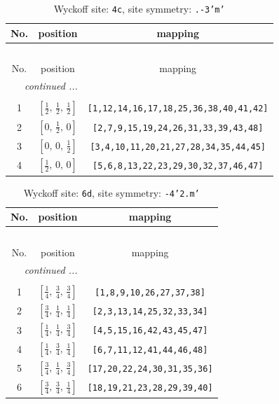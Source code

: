 \documentclass[fleqn,8pt]{jsarticle}
\begin{document}
\renewcommand{\arraystretch}{1.2}
\begin{longtable}{ccc}
\caption{Wyckoff site: {\tt 4c}, site symmetry: {\tt .-3'm'}}
 \\
 \hline \hline
No. & position & mapping \\ \hline \endfirsthead

\multicolumn{2}{l}{\tablename\ \thetable{}} \\
 \hline \hline
No. & position & mapping \\ \hline \endhead

 \hline \hline
\multicolumn{2}{r}{\footnotesize\it continued ...} \\ \endfoot

 \hline \hline
\multicolumn{2}{r}{} \\ \endlastfoot

1 & $\left[ \frac{1}{2},\, \frac{1}{2},\, \frac{1}{2} \right]$ & {\tt [1,12,14,16,17,18,25,36,38,40,41,42]} \\ \hline
2 & $\left[ 0,\, \frac{1}{2},\, 0 \right]$ & {\tt [2,7,9,15,19,24,26,31,33,39,43,48]} \\ \hline
3 & $\left[ 0,\, 0,\, \frac{1}{2} \right]$ & {\tt [3,4,10,11,20,21,27,28,34,35,44,45]} \\ \hline
4 & $\left[ \frac{1}{2},\, 0,\, 0 \right]$ & {\tt [5,6,8,13,22,23,29,30,32,37,46,47]} \\
\end{longtable}
\renewcommand{\arraystretch}{1.2}
\begin{longtable}{ccc}
\caption{Wyckoff site: {\tt 6d}, site symmetry: {\tt -4'2.m'}}
 \\
 \hline \hline
No. & position & mapping \\ \hline \endfirsthead

\multicolumn{2}{l}{\tablename\ \thetable{}} \\
 \hline \hline
No. & position & mapping \\ \hline \endhead

 \hline \hline
\multicolumn{2}{r}{\footnotesize\it continued ...} \\ \endfoot

 \hline \hline
\multicolumn{2}{r}{} \\ \endlastfoot

1 & $\left[ \frac{1}{4},\, \frac{3}{4},\, \frac{3}{4} \right]$ & {\tt [1,8,9,10,26,27,37,38]} \\ \hline
2 & $\left[ \frac{3}{4},\, \frac{1}{4},\, \frac{1}{4} \right]$ & {\tt [2,3,13,14,25,32,33,34]} \\ \hline
3 & $\left[ \frac{1}{4},\, \frac{1}{4},\, \frac{3}{4} \right]$ & {\tt [4,5,15,16,42,43,45,47]} \\ \hline
4 & $\left[ \frac{1}{4},\, \frac{3}{4},\, \frac{1}{4} \right]$ & {\tt [6,7,11,12,41,44,46,48]} \\ \hline
5 & $\left[ \frac{3}{4},\, \frac{1}{4},\, \frac{3}{4} \right]$ & {\tt [17,20,22,24,30,31,35,36]} \\ \hline
6 & $\left[ \frac{3}{4},\, \frac{3}{4},\, \frac{1}{4} \right]$ & {\tt [18,19,21,23,28,29,39,40]} \\
\end{longtable}
\end{document}
